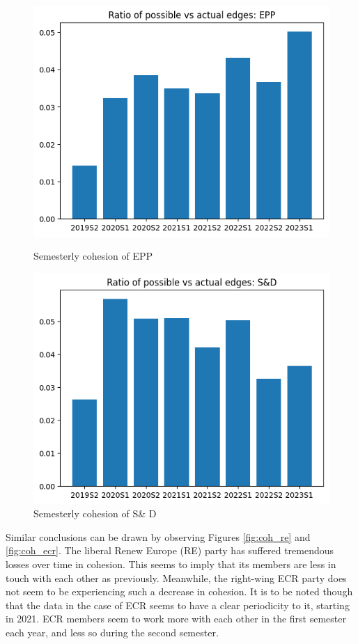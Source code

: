 \documentclass[lettersize,journal]{IEEEtran}
\begin{document}
\begin{figure}[h]
	\centering
	\begin{minipage}[b]{0.23\textwidth}
		\includegraphics[width=\textwidth]{coh_epp.png}
		\caption{Semesterly cohesion of EPP}
		\label{fig:coh_epp}
	\end{minipage}
	\hfill
	\begin{minipage}[b]{0.23\textwidth}
		\includegraphics[width=\textwidth]{coh_s&d.png}
		\caption{Semesterly cohesion of S\& D}
		\label{fig:coh_sd}
	\end{minipage}
\end{figure}

Similar conclusions can be drawn by observing Figures \ref{fig:coh_re} and \ref{fig:coh_ecr}. The liberal Renew Europe (RE) party has suffered tremendous losses over time in cohesion. This seems to imply that its members are less in touch with each other as previously. Meanwhile, the right-wing ECR party does not seem to be experiencing such a decrease in cohesion. It is to be noted though that the data in the case of ECR seems to have a clear periodicity to it, starting in 2021. ECR members seem to work more with each other in the first semester each year, and less so during the second semester.
\end{document}
